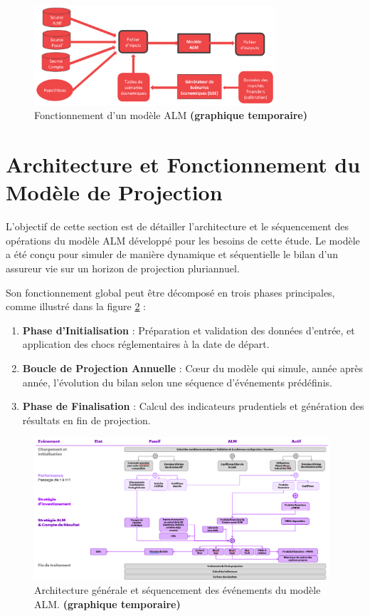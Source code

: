 \begin{figure}[H]
    \centering
    \includegraphics[width=0.8\textwidth]{images/2_chapitres/chapitre2/alm_det.png}
    \caption{Fonctionnement d'un modèle ALM \textbf{(graphique temporaire)}}
    \label{fig:alm_det}
\end{figure}



\section{Architecture et Fonctionnement du Modèle de Projection}
\label{sec:architecture_modele}

L'objectif de cette section est de détailler l'architecture et le séquencement des opérations du modèle ALM développé pour les besoins de cette étude. Le modèle a été conçu pour simuler de manière dynamique et séquentielle le bilan d'un assureur vie sur un horizon de projection pluriannuel.

Son fonctionnement global peut être décomposé en trois phases principales, comme illustré dans la figure \ref{fig:modele_alm_sequence} :
\begin{enumerate}
\item \textbf{Phase d'Initialisation} : Préparation et validation des données d'entrée, et application des chocs réglementaires à la date de départ.
\item \textbf{Boucle de Projection Annuelle} : Cœur du modèle qui simule, année après année, l'évolution du bilan selon une séquence d'événements prédéfinis.
\item \textbf{Phase de Finalisation} : Calcul des indicateurs prudentiels et génération des résultats en fin de projection.
\end{enumerate}

\begin{figure}[h!]
\centering
\includegraphics[width=0.98\textwidth]{images/2_chapitres/chapitre2/modele_alm_sequence.png}
\caption{Architecture générale et séquencement des événements du modèle ALM. \textbf{(graphique temporaire)}}
\label{fig:modele_alm_sequence}
\end{figure}

